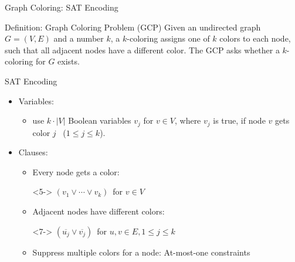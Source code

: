\documentclass[t]{sdqbeamer}
\begin{document}
\begin{frame}{Graph Coloring: SAT Encoding}
\begin{block}{Definition: Graph Coloring Problem (GCP)}
Given an undirected graph $G=(V,E)$ and a number $k$, a $k$-coloring assigns one of $k$ colors to each node, such that all adjacent nodes have a different color. The GCP asks whether a $k$-coloring for $G$ exists.
\end{block}
\pause
\begin{alert}{SAT Encoding}
\begin{itemize}
\item<2-> Variables: 
\begin{itemize}
	\item<3-> use $k \cdot |V|$ Boolean variables $v_j$ for $v \in V$, where $v_j$ is true, if node $v$ gets color $j$ ~($1 \leq j \leq k$).
\end{itemize}
\item<3-> Clauses: 
\begin{itemize}\setlength{\itemsep}{.5ex}
	\item<4-> Every node gets a color: 
	\item[]<5-> \quad $(v_1 \lor \cdots \lor v_k)\,$ for $v \in V$
	\item<6-> Adjacent nodes have different colors: 
	\item[]<7-> \quad $(\overline{u_j} \lor \overline{v_j})\,$ for ${u,v} \in E, 1 \leq j \leq k$
	\item<8-> Suppress multiple colors for a node: At-most-one constraints
\end{itemize}
\end{itemize}
\end{alert}
\end{frame}
\end{document}

